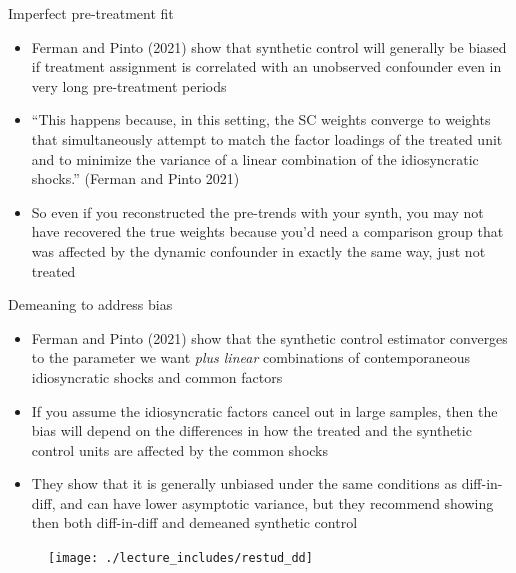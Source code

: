 \documentclass{beamer}
\begin{document}
\begin{frame}{Imperfect pre-treatment fit }

\begin{itemize}

\item Ferman and Pinto (2021) show that synthetic control will generally be biased if treatment assignment is correlated with an unobserved confounder even in very long pre-treatment periods

\item ``This happens because, in this setting, the SC weights converge to weights that simultaneously attempt to match the factor loadings of the treated unit and to minimize the variance of a linear combination of the idiosyncratic shocks.'' (Ferman and Pinto 2021)

\item So even if you reconstructed the pre-trends with your synth, you may not have recovered the true weights because you'd need a comparison group that was affected by the dynamic confounder in exactly the same way, just not treated

\end{itemize}

\end{frame}


\begin{frame}{Demeaning to address bias}

\begin{itemize}
\item Ferman and Pinto (2021) show that the synthetic control estimator converges to the parameter we want \emph{plus linear} combinations of contemporaneous idiosyncratic shocks and common factors
\item If you assume the idiosyncratic factors cancel out in large samples, then the bias will depend on the differences in how the treated and the synthetic control units are affected by the common shocks
\item They show that it is generally unbiased under the same conditions as diff-in-diff, and can have lower asymptotic variance, but they recommend showing then both diff-in-diff and demeaned synthetic control

\end{itemize}

\end{frame}


\begin{frame}{}

\begin{figure}
\texttt{[image: ./lecture\_includes/restud\_dd]}
\end{figure}

\end{frame}
\end{document}
